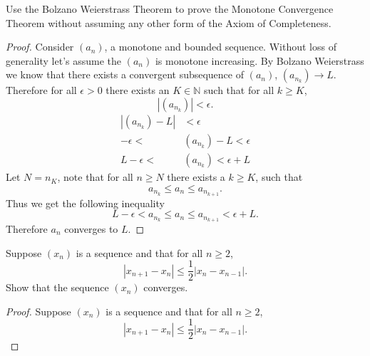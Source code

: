 \documentclass[12pt]{article}
\makeatletter
\theoremstyle{homework}
\newenvironment{exercise}[1]
{\def\@currentlabel{#1}\exercisecore}
{\endexercisecore}
\newcommand{\Nats}{\ensuremath{\mathbb N}}
\makeatother
\begin{document}
\begin{exercise}{7} Use the Bolzano Weierstrass Theorem to prove the Monotone Convergence Theorem 
  without assuming any other form of the Axiom of Completeness.\\
  
  \begin{proof} Consider $(a_n)$, a monotone and bounded sequence. Without loss of generality let's assume
    the $(a_n)$ is monotone increasing. By Bolzano Weierstrass we know that there exists a convergent subsequence of $(a_n)$,
    $(a_{n_k}) \to L$. Therefore for all $\epsilon > 0$ there exists an $K \in \Nats$ such that for all $k \geq K$,
    \begin{equation*}
      |(a_{n_k})| < \epsilon.
    \end{equation*} 
    \begin{align*}
      |(a_{n_k}) - L| &< \epsilon\\
      -\epsilon < &(a_{n_k}) - L < \epsilon\\
      L - \epsilon < &(a_{n_k})< \epsilon + L
    \end{align*}
    Let $N = n_K$, note that for all $n \geq N$ there exists a $k \geq K$, such that
    \begin{equation*}
      a_{n_k} \le a_n \le a_{n_{k+1}}.
    \end{equation*}
    Thus we get the following inequality
    \begin{equation*}
      L - \epsilon < a_{n_k} \le a_n \le a_{n_{k+1}}< \epsilon + L.
    \end{equation*}
    Therefore $a_n$ converges to $L$. 
  \end{proof}




  \begin{exercise}{8} Suppose $(x_n)$ is a sequence and that for all $n \geq 2$,
    \begin{equation*}
      |x_{n+1} - x_n| \le \dfrac{1}{2} |x_n - x_{n-1}|.
    \end{equation*}
    Show that the sequence $(x_n)$ converges. \\

    \begin{proof}
      Suppose $(x_n)$ is a sequence and that for all $n \geq 2$,
      \begin{equation*}
        |x_{n+1} - x_n| \le \dfrac{1}{2} |x_n - x_{n-1}|.
      \end{equation*}


    \end{proof}





  \end{exercise}

\end{exercise}
\end{document}
